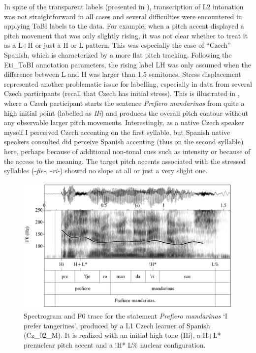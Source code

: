 In spite of the transparent labels (presented in ), transcription of L2 intonation was not straightforward in all cases and several difficulties were encountered in applying ToBI labels to the data. For example, when a pitch accent displayed a pitch movement that was only slightly rising, it was not clear whether to treat it as a L+H or just a H or L pattern. This was especially the case of “Czech” Spanish, which is characterized by a more flat pitch tracking. Following the Eti\_ToBI annotation parameters, the rising label LH was only assumed when the difference between L and H was larger than 1.5 semitones. Stress displacement represented another problematic issue for labelling, especially in data from several Czech participants (recall that Czech has initial stress). This is illustrated in , where a Czech participant starts the sentence \textit{Prefiero mandarinas} from quite a high initial point (labelled as \textit{Hi}) and produces the overall pitch contour without any observable larger pitch movements. Interestingly, as a native Czech speaker myself I perceived Czech accenting on the first syllable, but Spanish native speakers consulted did perceive Spanish accenting (thus on the second syllable) here, perhaps because of additional non-tonal cues such as intensity or because of the access to the meaning. The target pitch accents associated with the stressed syllables (-\textit{fie-}, -\textit{ri-}) showed no slope at all or just a very slight one.




\begin{figure}[p]
\includegraphics[width=.9\textwidth]{figures/a03HabilMethodology-img005-new.png}
\caption{Spectrogram and F0 trace for the statement \textit{Prefiero mandarinas} ‘I prefer tangerines’, produced by a L1 Czech learner of Spanish (Cz\_02\_M). It is realized with an initial high tone (Hi), a H+L* prenuclear pitch accent and a !H* L\% nuclear configuration.}
\label{fig:3.5}
\end{figure}

